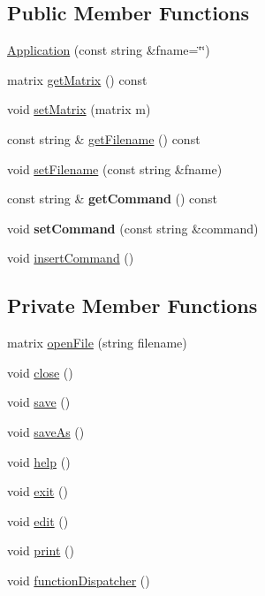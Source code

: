 \subsection*{Public Member Functions}
\begin{DoxyCompactItemize}
\item 
\hyperlink{class_application_ade4650e7378dae1d94794b86995fd571}{Application} (const string \&fname=\char`\"{}\char`\"{})
\item 
matrix \hyperlink{class_application_a67aeb617ca44a18045612d92f1d8afa0}{get\+Matrix} () const
\item 
void \hyperlink{class_application_a56b4a55e9eabd40b7f0033ba39631ebe}{set\+Matrix} (matrix m)
\item 
const string \& \hyperlink{class_application_a778575fb76de5352152d8928e1c3410f}{get\+Filename} () const
\item 
void \hyperlink{class_application_a76de879568ee39ac80484441716928d2}{set\+Filename} (const string \&fname)
\item 
\mbox{\label{class_application_a74cdbc5e93e1f2c6bb4b45a6ad8b8a62}} 
const string \& {\bfseries get\+Command} () const
\item 
\mbox{\label{class_application_ae652f7ff140c5a74c3806f728e9a18f3}} 
void {\bfseries set\+Command} (const string \&command)
\item 
void \hyperlink{class_application_a474d8507e340581404d4044c0228f655}{insert\+Command} ()
\end{DoxyCompactItemize}
\subsection*{Private Member Functions}
\begin{DoxyCompactItemize}
\item 
matrix \hyperlink{class_application_ab2f161414a4e2f16e28321c192051006}{open\+File} (string filename)
\item 
void \hyperlink{class_application_a5a7dcf61b6701a2b2665c78e4e074e73}{close} ()
\item 
void \hyperlink{class_application_a2cbf94e01d55a814de35f90f4d874647}{save} ()
\item 
void \hyperlink{class_application_a10d5a48c95593cee25c1b9e0e257b5a7}{save\+As} ()
\item 
void \hyperlink{class_application_a2c6518d7f121299d9be8c66d31997fbc}{help} ()
\item 
void \hyperlink{class_application_a3c8a98d6c10a5b054800488df16cdbcb}{exit} ()
\item 
void \hyperlink{class_application_a4b193bf9c8be7105e89a2323ea77b1f4}{edit} ()
\item 
void \hyperlink{class_application_a2bc1937440cb9e71dace95c3fe7ed4ea}{print} ()
\item 
void \hyperlink{class_application_a00241f0a09c32b0ef3cb1f068475cc50}{function\+Dispatcher} ()
\end{DoxyCompactItemize}
